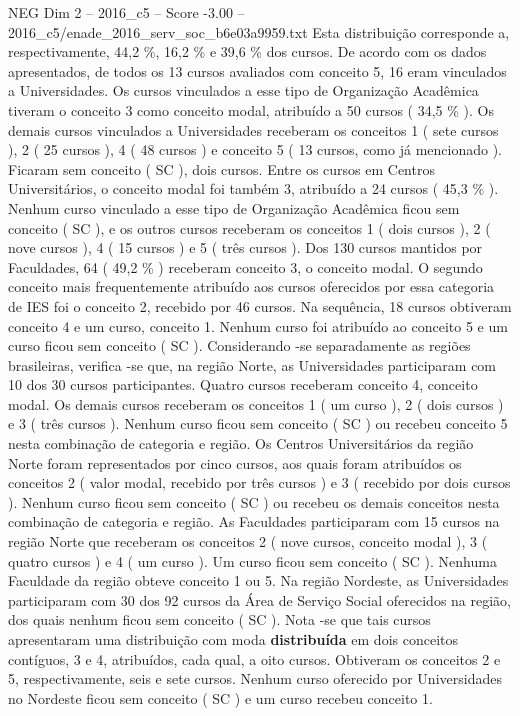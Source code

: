 \begin{textsample}{NEG Dim 2 – 2016\_c5 – Score -3.00 – 2016\_c5/enade\_2016\_serv\_soc\_b6e03a9959.txt}
Esta distribuição corresponde a, respectivamente, 44,2 \%, 16,2 \% e 39,6 \% dos cursos.
De acordo com os dados apresentados, de todos os 13 cursos avaliados com conceito 5, 16 eram vinculados a Universidades.
Os cursos vinculados a esse tipo de Organização Acadêmica tiveram o conceito 3 como conceito modal, atribuído a 50 cursos ( 34,5 \% ).
Os demais cursos vinculados a Universidades receberam os conceitos 1 ( sete cursos ), 2 ( 25 cursos ), 4 ( 48 cursos ) e conceito 5 ( 13 cursos, como já mencionado ).
Ficaram sem conceito ( SC ), dois cursos.
Entre os cursos em Centros Universitários, o conceito modal foi também 3, atribuído a 24 cursos ( 45,3 \% ).
Nenhum curso vinculado a esse tipo de Organização Acadêmica ficou sem conceito ( SC ), e os outros cursos receberam os conceitos 1 ( dois cursos ), 2 ( nove cursos ), 4 ( 15 cursos ) e 5 ( três cursos ).
Dos 130 cursos mantidos por Faculdades, 64 ( 49,2 \% ) receberam conceito 3, o conceito modal.
O segundo conceito mais frequentemente atribuído aos cursos oferecidos por essa categoria de IES foi o conceito 2, recebido por 46 cursos.
Na sequência, 18 cursos obtiveram conceito 4 e um curso, conceito 1.
Nenhum curso foi atribuído ao conceito 5 e um curso ficou sem conceito ( SC ).
Considerando -se separadamente as regiões brasileiras, verifica -se que, na região Norte, as Universidades participaram com 10 dos 30 cursos participantes.
Quatro cursos receberam conceito 4, conceito modal.
Os demais cursos receberam os conceitos 1 ( um curso ), 2 ( dois cursos ) e 3 ( três cursos ).
Nenhum curso ficou sem conceito ( SC ) ou recebeu conceito 5 nesta combinação de categoria e região.
Os Centros Universitários da região Norte foram representados por cinco cursos, aos quais foram atribuídos os conceitos 2 ( valor modal, recebido por três cursos ) e 3 ( recebido por dois cursos ).
Nenhum curso ficou sem conceito ( SC ) ou recebeu os demais conceitos nesta combinação de categoria e região.
As Faculdades participaram com 15 cursos na região Norte que receberam os conceitos 2 ( nove cursos, conceito modal ), 3 ( quatro cursos ) e 4 ( um curso ).
Um curso ficou sem conceito ( SC ).
Nenhuma Faculdade da região obteve conceito 1 ou 5.
Na região Nordeste, as Universidades participaram com 30 dos 92 cursos da Área de Serviço Social oferecidos na região, dos quais nenhum ficou sem conceito ( SC ).
Nota -se que tais cursos apresentaram uma distribuição com moda \textbf{distribuída} em dois conceitos contíguos, 3 e 4, atribuídos, cada qual, a oito cursos.
Obtiveram os conceitos 2 e 5, respectivamente, seis e sete cursos.
Nenhum curso oferecido por Universidades no Nordeste ficou sem conceito ( SC ) e um curso recebeu conceito 1.

\end{textsample}
